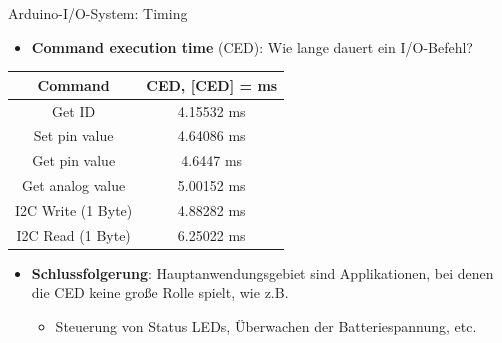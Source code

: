 \documentclass{beamer}
\begin{document}
\begin{frame}{Arduino-I/O-System: Timing}
	\begin{itemize}
		\item \textbf{Command execution time} (CED): Wie lange dauert ein I/O-Befehl?
	\end{itemize}
	\begin{table}[htbp]
		\begin{tabular}{|c|c|}
			\hline 
			\textbf{Command} & \textbf{CED, [CED] = ms} \\ 
			\hline \hline 
			Get ID & 4.15532 ms \\ 
			\hline 
			Set pin value & 4.64086 ms  \\ 
			\hline
			Get pin value & 4.6447 ms \\ 
			\hline
			Get analog value & 5.00152 ms \\ 
			\hline
			I2C Write (1 Byte)  & 4.88282 ms\\ 
			\hline
			I2C Read (1 Byte) & 6.25022 ms \\
			\hline
		\end{tabular}
	\end{table}
	\begin{itemize}
		\item \textbf{Schlussfolgerung}: Hauptanwendungsgebiet sind Applikationen, bei denen die CED keine gro\ss{}e Rolle spielt, wie z.B.
		\begin{itemize}
			\item Steuerung von Status LEDs, \"Uberwachen der Batteriespannung, etc.
		\end{itemize}
	\end{itemize}
\end{frame}
\end{document}
